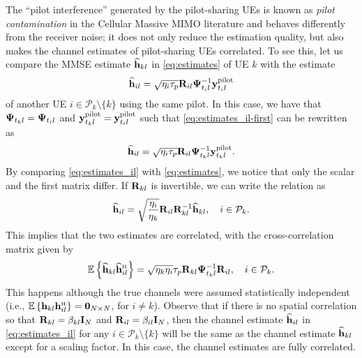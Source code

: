 The ``pilot interference'' generated by the pilot-sharing UEs is known as \emph{pilot contamination} in the Cellular Massive MIMO literature and behaves differently from the receiver noise; it does not only reduce the estimation quality, but also makes the channel estimates of pilot-sharing UEs correlated. To see this, let us compare the MMSE estimate $\widehat{\mathbf{h}}_{kl}$ in \eqref{eq:estimates} of UE $k$ with the estimate 
\begin{equation} \label{eq:estimates_il-first}
\widehat{\mathbf{h}}_{il} =  \sqrt{\eta_i \tau_p} \mathbf{R}_{il} \mathbf{\Psi}_{t_i l}^{-1} \mathbf{y}_{t_i l}^{{\rm pilot}}
\end{equation}
of another UE $i \in \mathcal{P}_{k}\setminus \{ k \}$ using the same pilot. In this case, we have that $\mathbf{\Psi}_{t_kl} = \mathbf{\Psi}_{t_il}$ and 
$\mathbf{y}_{t_kl}^{{\rm pilot}} = \mathbf{y}_{t_il}^{{\rm pilot}} $ such that \eqref{eq:estimates_il-first} can be rewritten as
\begin{align}\label{eq:estimates_il}
\widehat{\mathbf{h}}_{il} = \sqrt{\eta_i \tau_p} \mathbf{R}_{il} \mathbf{\Psi}_{t_kl}^{-1} \mathbf{y}_{t_kl}^{{\rm pilot}}.
\end{align}
By comparing \eqref{eq:estimates_il} with \eqref{eq:estimates}, we notice that only the scalar and the first matrix differ. If $\mathbf{R}_{kl}$ is invertible, we can write the relation as
\begin{equation} \label{eq:relation-i-k-estimates}
\widehat{\mathbf{h}}_{il}   =\sqrt{ \frac{\eta_i}{\eta_k} }  \mathbf{R}_{il}\mathbf{R}_{kl}^{-1}   \widehat{\mathbf{h}}_{kl}, \quad i\in\mathcal{P}_k.
\end{equation}
This implies that the two estimates are correlated, with the cross-correlation matrix given by
\begin{equation} \label{eq:cross-correlation-channel-estimates}
\mathbb{E}\left\{\widehat{\vect{h}}_{kl}\widehat{\vect{h}}_{il}^{\Htran}\right\}=\sqrt{\eta_k\eta_i}\tau_p\vect{R}_{kl}\vect{\Psi}_{t_kl}^{-1}\vect{R}_{il}, \quad i\in\mathcal{P}_k.
\end{equation}  
This happens although the true channels were assumed statistically independent (i.e., $
\mathbb{E}\left\{{\vect{h}}_{kl}{\vect{h}}_{il}^{\Htran}\right\} = {\bf 0}_{N\times N}$, for $i\neq k$). Observe that if there is no spatial correlation so that $\mathbf{R}_{kl}=\beta_{kl}\mathbf{I}_{N}$ and $\mathbf{R}_{il}=\beta_{il}\mathbf{I}_{N}$, then the channel estimate $\widehat{\mathbf{h}}_{il}$ in \eqref{eq:estimates_il} for any $i\in \mathcal{P}_k \setminus \{ k \}$ will be the same as the channel estimate $\widehat{\mathbf{h}}_{kl}$ except for a scaling factor. In this case, the channel estimates are fully correlated. 

